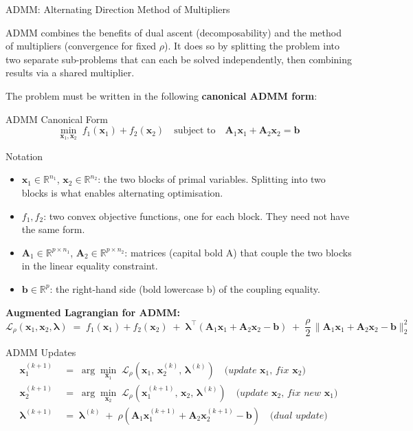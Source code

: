 \documentclass[aspectratio=169,10pt]{beamer}
\newcommand{\bx}{\mathbf{x}}
\newcommand{\bA}{\mathbf{A}}
\newcommand{\bb}{\mathbf{b}}
\newcommand{\blam}{\boldsymbol{\lambda}}
\newcommand{\R}{\mathbb{R}}
\newcommand{\calL}{\mathcal{L}}
\begin{document}
\begin{frame}[allowframebreaks]{ADMM: Alternating Direction Method of Multipliers}

  ADMM combines the benefits of dual ascent (decomposability) and the
  method of multipliers (convergence for fixed $\rho$).  It does so by
  splitting the problem into two separate sub-problems that can each be
  solved independently, then combining results via a shared multiplier.

  The problem must be written in the following \textbf{canonical ADMM form}:

  \begin{block}{ADMM Canonical Form}
    \[
      \min_{\bx_1, \bx_2}\; f_1(\bx_1) + f_2(\bx_2)
      \quad \text{subject to} \quad
      \bA_1 \bx_1 + \bA_2 \bx_2 = \bb
    \]
  \end{block}

  \begin{block}{Notation}
    \begin{itemize}
      \item $\bx_1 \in \R^{n_1}$, $\bx_2 \in \R^{n_2}$: the two blocks of
            primal variables.  Splitting into two blocks is what enables
            alternating optimisation.
      \item $f_1, f_2$: two convex objective functions, one for each block.
            They need not have the same form.
      \item $\bA_1 \in \R^{p \times n_1}$, $\bA_2 \in \R^{p \times n_2}$:
            matrices (capital bold A) that couple the two blocks in the
            linear equality constraint.
      \item $\bb \in \R^p$: the right-hand side (bold lowercase b) of the
            coupling equality.
    \end{itemize}
  \end{block}

  \framebreak

  \textbf{Augmented Lagrangian for ADMM:}
  \[
    \calL_\rho(\bx_1, \bx_2, \blam)
    \;=\; f_1(\bx_1) + f_2(\bx_2)
    \;+\; \blam^\top(\bA_1\bx_1 + \bA_2\bx_2 - \bb)
    \;+\; \frac{\rho}{2}\,\|\bA_1\bx_1 + \bA_2\bx_2 - \bb\|_2^2
  \]

  \begin{block}{ADMM Updates}
    \begin{align*}
      \bx_1^{(k+1)} &\;=\; \arg\min_{\bx_1}\;
        \calL_\rho\!\left(\bx_1,\, \bx_2^{(k)},\, \blam^{(k)}\right)
        \quad \textit{(update $\bx_1$, fix $\bx_2$)}\\[4pt]
      \bx_2^{(k+1)} &\;=\; \arg\min_{\bx_2}\;
        \calL_\rho\!\left(\bx_1^{(k+1)},\, \bx_2,\, \blam^{(k)}\right)
        \quad \textit{(update $\bx_2$, fix new $\bx_1$)}\\[4pt]
      \blam^{(k+1)} &\;=\; \blam^{(k)}
        \;+\; \rho\!\left(\bA_1\bx_1^{(k+1)} + \bA_2\bx_2^{(k+1)} - \bb\right)
        \quad \textit{(dual update)}
    \end{align*}
  \end{block}


\end{frame}
\end{document}
